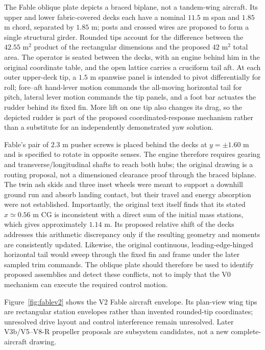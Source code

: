 \documentclass[11pt,a4paper]{article}
\begin{document}
The Fable oblique plate depicts a braced biplane, not a tandem-wing aircraft. Its upper and lower fabric-covered decks each have a nominal $11.5$ m span and $1.85$ m chord, separated by $1.85$ m; posts and crossed wires are proposed to form a single structural girder. Rounded tips account for the difference between the $42.55$ m$^2$ product of the rectangular dimensions and the proposed $42$ m$^2$ total area. The operator is seated between the decks, with an engine behind him in the original coordinate table, and the open lattice carries a cruciform tail aft. At each outer upper-deck tip, a $1.5$ m spanwise panel is intended to pivot differentially for roll; fore--aft hand-lever motion commands the all-moving horizontal tail for pitch, lateral lever motion commands the tip panels, and a foot bar actuates the rudder behind its fixed fin. More lift on one tip also changes its drag, so the depicted rudder is part of the proposed coordinated-response mechanism rather than a substitute for an independently demonstrated yaw solution.

Fable's pair of $2.3$ m pusher screws is placed behind the decks at $y=\pm1.60$ m and is specified to rotate in opposite senses. The engine therefore requires gearing and transverse/longitudinal shafts to reach both hubs; the original drawing is a routing proposal, not a dimensioned clearance proof through the braced biplane. The twin ash skids and three inset wheels were meant to support a downhill ground run and absorb landing contact, but their travel and energy absorption were not established. Importantly, the original text itself finds that its stated $x\simeq0.56$ m CG is inconsistent with a direct sum of the initial mass stations, which gives approximately $1.14$ m. Its proposed relative shift of the decks addresses this arithmetic discrepancy only if the resulting geometry and moments are consistently updated. Likewise, the original continuous, leading-edge-hinged horizontal tail would sweep through the fixed fin and frame under the later sampled trim commands. The oblique plate should therefore be used to identify proposed assemblies and detect these conflicts, not to imply that the V0 mechanism can execute the required control motion.

Figure~\ref{fig:fablev2} shows the V2 Fable aircraft envelope. Its plan-view wing tips are rectangular station envelopes rather than invented rounded-tip coordinates; unresolved drive layout and control interference remain unresolved. Later V3b/V5--V8-R propeller proposals are subsystem candidates, not a new complete-aircraft drawing.
\end{document}
